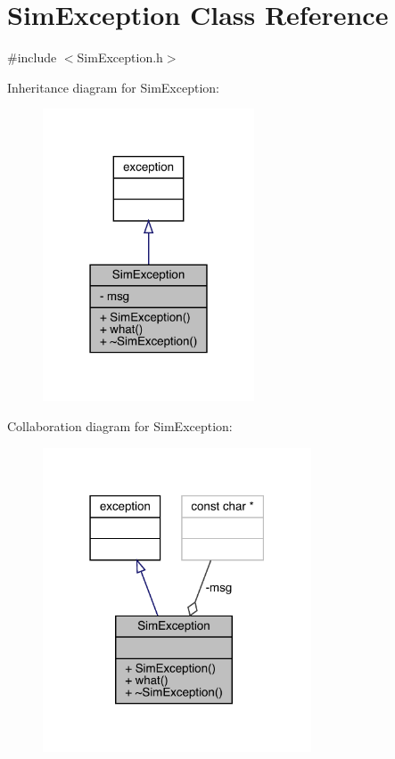 \hypertarget{class_sim_exception}{}\section{Sim\+Exception Class Reference}
\label{class_sim_exception}


{\ttfamily \#include $<$Sim\+Exception.\+h$>$}



Inheritance diagram for Sim\+Exception\+:
\nopagebreak
\begin{figure}[H]
\begin{center}
\leavevmode
\includegraphics[width=178pt]{class_sim_exception__inherit__graph}
\end{center}
\end{figure}


Collaboration diagram for Sim\+Exception\+:
\nopagebreak
\begin{figure}[H]
\begin{center}
\leavevmode
\includegraphics[width=226pt]{class_sim_exception__coll__graph}
\end{center}
\end{figure}
